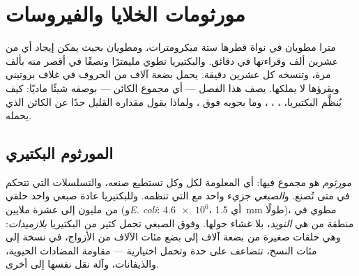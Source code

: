 \chapter{مورثومات الخلايا والفيروسات}\label{ch:b1:genomes}

مترا  مطويان في نواة قطرها ستة ميكرومترات، ومطويان بحيث يمكن إيجاد
أي من عشرين ألف  وقراءتها في دقائق. والبكتيريا تطوي مليمترًا
ونصفًا في  أقصر منه بألف مرة، وتنسخه كل عشرين دقيقة. 
يحمل بضعة آلاف من الحروف في غلاف بروتيني ويقرؤها  لا يملكها.
يصف هذا الفصل \emph{} --- أي مجموع  الكائن --- بوصفه شيئًا
ماديًا: كيف يُنظَّم  البكتيريا،  ، ،
، وما يحويه فوق ، ولماذا يقول مقداره القليل جدًا عن
الكائن الذي يحمله.

\section{المورثوم البكتيري}

\begin{definition}\label{def:b1:genomes:genome}
\emph{مورثوم}  هو مجموع  فيها: أي المعلومة لكل
 وكل  تستطيع صنعه، والتسلسلات التي تتحكم في متى تُصنع.
و\emph{الصبغي} جزيء  واحد مع  التي تنظمه.
وللبكتيريا عادة صبغي واحد حلقي من مليون إلى عشرة ملايين 
(و\emph{E. coli}: $\num{4.6e6}$، أي \qty{1.5}{mm} طولًا)، مطوي في
منطقة من  هي \emph{النويد}، بلا غشاء حولها.
وفوق الصبغي تحمل كثير من البكتيريا \emph{بلازميدات}:
وهي حلقات صغيرة من بضعة آلاف إلى بضع مئات الآلاف من الأزواج، في نسخة
إلى مئات النسخ، تتضاعف على حدة وتحمل  اختيارية --- مقاومة
المضادات الحيوية، والذيفانات، وآلة نقل نفسها إلى  أخرى.
\end{definition}

